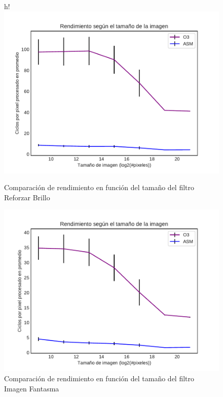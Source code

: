 \documentclass[a4paper]{article}
\begin{document}
\begin{figure}{h!}
	\centering
	\includegraphics[scale= 0.55]{img/ColorBordesO3vsASM.pdf}
	\caption{Comparación de rendimiento en función del tamaño del filtro Reforzar Brillo}
\end{figure}
\begin{figure}[h!]
	\centering
	\includegraphics[scale = 0.55]{img/ReforzarBrilloO3vsASM.pdf}
	\caption{Comparación de rendimiento en función del tamaño del filtro Imagen Fantasma}
\end{figure}

\newpage
\end{document}
